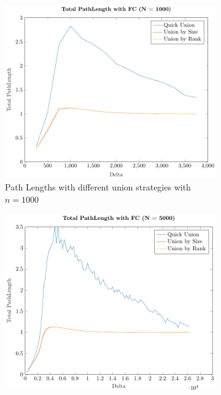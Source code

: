 \begin{figure}[ht]
    \centering
    \begin{subfigure}{0.32\textwidth}
        \centering
        \includegraphics[width=\textwidth]{../images/plotFCFull1000_PathLength.pdf}
        \caption{Path Lengths with different union strategies with $n = 1000$}
    \end{subfigure}%
    \hfill
    \begin{subfigure}{0.32\textwidth}
        \centering
        \includegraphics[width=\textwidth]{../images/plotFCFull5000_PathLength.pdf}

\end{subfigure}
\end{figure}
